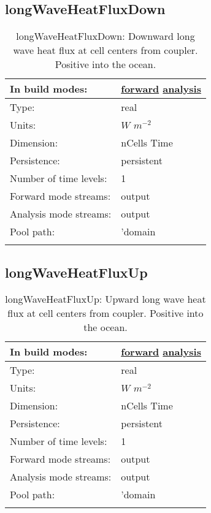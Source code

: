 \subsection[longWaveHeatFluxDown]{longWaveHeatFluxDown}
\label{subsec:var_sec_forcing_longWaveHeatFluxDown}
\begin{center}
\begin{longtable}{| p{2.0in} | p{4.0in} |}
        \hline 
        In build modes: & \hyperref[subsec:forward_var_tab_forcing]{forward} \hyperref[subsec:analysis_var_tab_forcing]{analysis} \\
        \hline 
        Type: & real \\
        \hline 
        Units: & $W$ $m^{-2}$ \\
        \hline 
        Dimension: & nCells Time \\
        \hline 
        Persistence: & persistent \\
        \hline 
        Number of time levels: & 1 \\
        \hline 
		 Forward mode streams: &  output \\
        \hline 
		 Analysis mode streams: &  output \\
        \hline 
            Pool path: & 'domain %
 \\
		 \hline 
    \caption{longWaveHeatFluxDown: Downward long wave heat flux at cell centers from coupler. Positive into the ocean.}
\end{longtable}
\end{center}
\subsection[longWaveHeatFluxUp]{longWaveHeatFluxUp}
\label{subsec:var_sec_forcing_longWaveHeatFluxUp}
\begin{center}
\begin{longtable}{| p{2.0in} | p{4.0in} |}
        \hline 
        In build modes: & \hyperref[subsec:forward_var_tab_forcing]{forward} \hyperref[subsec:analysis_var_tab_forcing]{analysis} \\
        \hline 
        Type: & real \\
        \hline 
        Units: & $W$ $m^{-2}$ \\
        \hline 
        Dimension: & nCells Time \\
        \hline 
        Persistence: & persistent \\
        \hline 
        Number of time levels: & 1 \\
        \hline 
		 Forward mode streams: &  output \\
        \hline 
		 Analysis mode streams: &  output \\
        \hline 
            Pool path: & 'domain %
 \\
		 \hline 
    \caption{longWaveHeatFluxUp: Upward long wave heat flux at cell centers from coupler. Positive into the ocean.}
\end{longtable}
\end{center}
